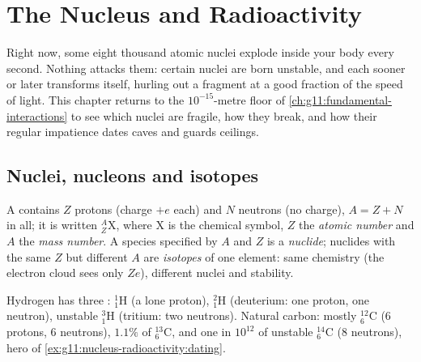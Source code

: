 \chapter{The Nucleus and Radioactivity}\label{ch:g11:nucleus-radioactivity}

Right now, some eight thousand atomic nuclei explode inside your body every
second. Nothing attacks them: certain nuclei are born unstable, and each
sooner or later transforms itself, hurling out a fragment at a good fraction
of the speed of light. This chapter returns to the $10^{-15}$-metre floor of
\cref{ch:g11:fundamental-interactions} to see which nuclei are fragile, how
they break, and how their regular impatience dates caves and guards ceilings.

\section{Nuclei, nucleons and isotopes}

\begin{definition}\label{def:g11:nucleus-radioactivity:notation}
A  contains $Z$ protons (charge $+e$ each) and $N$ neutrons (no
charge), $A = Z + N$  in all; it is written ${}^{A}_{Z}\mathrm{X}$,
where $\mathrm X$ is the chemical symbol, $Z$ the \emph{atomic
number} and $A$ the \emph{mass number}. A species specified by $A$ and $Z$ is a \emph{nuclide};
nuclides with the same $Z$ but different $A$ are \emph{isotopes}
of one element: same chemistry (the electron cloud sees only $Ze$),
different nuclei and stability.
\end{definition}

\begin{example}\label{ex:g11:nucleus-radioactivity:hc}
Hydrogen has three : ${}^{1}_{1}\mathrm{H}$ (a lone proton),
${}^{2}_{1}\mathrm{H}$ (deuterium: one proton, one neutron), unstable
${}^{3}_{1}\mathrm{H}$ (tritium: two neutrons). Natural carbon: mostly
${}^{12}_{6}\mathrm{C}$ ($6$ protons, $6$ neutrons), $1.1\%$ of
${}^{13}_{6}\mathrm{C}$, and one  in $10^{12}$ of unstable
${}^{14}_{6}\mathrm{C}$ ($8$ neutrons), hero of \cref{ex:g11:nucleus-radioactivity:dating}.
\end{example}

